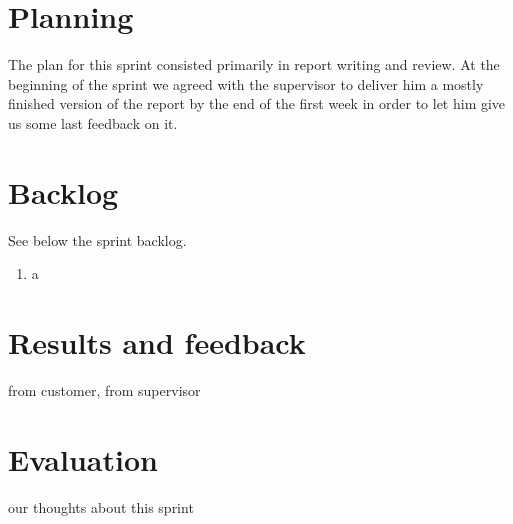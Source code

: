 \section{Planning}

The plan for this sprint consisted primarily in report writing and review.
At the beginning of the sprint we agreed with the supervisor to deliver him a mostly
finished version of the report by the end of the first week in order to let him
give us some last feedback on it.

\section{Backlog}
See below the sprint backlog.
\begin{enumerate}[1.]
\item a
\end{enumerate}

\section{Results and feedback}

from customer, from supervisor
\section{Evaluation}
our thoughts about this sprint